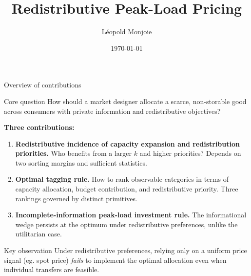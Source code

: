 \documentclass[10pt, aspectratio=169]{beamer}
\title[Redistributive Peak-Load Pricing]{\textbf{Redistributive Peak-Load Pricing}}
\author[L. Monjoie]{L\'eopold Monjoie}
\institute[Aalto University]{Aalto University \\ \texttt{leopold.monjoie@aalto.fi}}
\date{\today}
\begin{document}

\begin{frame}
\titlepage
\end{frame}

\begin{frame}{Overview of contributions}
\begin{block}{Core question}
How should a market designer allocate a scarce, non-storable good across consumers with private information and redistributive objectives?
\end{block}
\vspace{0.3cm}
\textbf{Three contributions:}
\begin{enumerate}
\item \textbf{Redistributive incidence of capacity expansion and redistribution priorities.} Who benefits from a larger $k$ and higher priorities? Depends on two sorting margins and sufficient statistics.
\item \textbf{Optimal tagging rule.} How to rank observable categories in terms of capacity allocation, budget contribution, and redistributive priority. Three rankings governed by distinct primitives.
\item \textbf{Incomplete-information peak-load investment rule.} The informational wedge persists at the optimum under redistributive preferences, unlike the utilitarian case.
\end{enumerate}
\vspace{0.2cm}
\begin{alertblock}{Key observation}
Under redistributive preferences, relying only on a uniform price signal (eg. spot price) \emph{fails} to implement the optimal allocation even when individual transfers are feasible.
\end{alertblock}
\end{frame}
\end{document}
